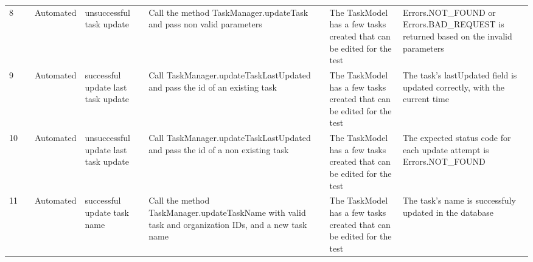 \documentclass{article}
\begin{document}
{\begin{tabular}{|l|c|l|l|l|l|l|}
    \rowcolor[HTML]{FFFFFF}
    8                                                             & \cellcolor[HTML]{FFFFFF}                                                     & {\color[HTML]{11734B} Automated}                                & unsuccessful task update                       & Call the method TaskManager.updateTask and pass non valid parameters                                                             & The TaskModel has a few tasks created that can be edited for the test                          & Errors.NOT\_FOUND or Errors.BAD\_REQUEST is returned based on the invalid parameters                                          \\ \cline{1-1} \cline{3-7}
    \rowcolor[HTML]{FFFFFF}
    9                                                             & \cellcolor[HTML]{FFFFFF}                                                     & {\color[HTML]{11734B} Automated}                                & successful update last task update             & Call TaskManager.updateTaskLastUpdated and pass the id of an existing task                                                       & The TaskModel has a few tasks created that can be edited for the test                          & The task's lastUpdated field is updated correctly, with the current time                                                      \\ \cline{1-1} \cline{3-7}
    \rowcolor[HTML]{FFFFFF}
    10                                                            & \cellcolor[HTML]{FFFFFF}                                                     & {\color[HTML]{11734B} Automated}                                & unsuccessful update last task update           & Call TaskManager.updateTaskLastUpdated and pass the id of a non existing task                                                    & The TaskModel has a few tasks created that can be edited for the test                          & The expected status code for each update attempt is Errors.NOT\_FOUND                                                         \\ \cline{1-1} \cline{3-7}
    \rowcolor[HTML]{FFFFFF}
    11                                                            & \cellcolor[HTML]{FFFFFF}                                                     & {\color[HTML]{11734B} Automated}                                & successful update task name                    & Call the method TaskManager.updateTaskName with valid task and organization IDs, and a new task name                             & The TaskModel has a few tasks created that can be edited for the test                          & The task's name is successfuly updated in the database                                                                        \\ \cline{1-1} \cline{3-7}

\end{tabular}}
\end{document}
